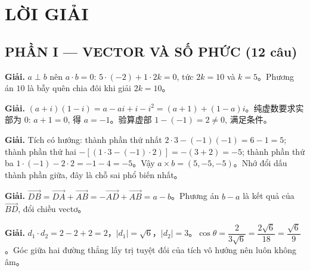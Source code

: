 \documentclass[11pt, a4paper]{article}
\begin{document}
\section{LỜI GIẢI}

\subsection{PHẦN I — VECTOR VÀ SỐ PHỨC (12 câu)}

\begin{dapan}[1 — Đáp án A]

\textbf{Giải.} $a\perp b$ nên $a\cdot b=0$: $5\cdot(-2)+1\cdot2k=0$, tức $2k=10$ và $k=5$。Phương án $10$ là bẫy quên chia đôi khi giải $2k=10$。


\end{dapan}
\vspace{0.3cm}
\begin{dapan}[2 — Đáp án C]

\textbf{Giải.} $(a+i)(1-i)=a-ai+i-i^2=(a+1)+(1-a)i$。纯虚数要求实部为 $0$: $a+1=0$, 得 $a=-1$。验算虚部 $1-(-1)=2\neq0$, 满足条件。


\end{dapan}
\vspace{0.3cm}
\begin{dapan}[3 — Đáp án A]

\textbf{Giải.} Tích có hướng: thành phần thứ nhất $2\cdot3-(-1)(-1)=6-1=5$; thành phần thứ hai $-[(1\cdot3-(-1)\cdot2)]=-(3+2)=-5$; thành phần thứ ba $1\cdot(-1)-2\cdot2=-1-4=-5$。Vậy $a\times b=(5,-5,-5)$。Nhớ đổi dấu thành phần giữa, đây là chỗ sai phổ biến nhất。


\end{dapan}
\vspace{0.3cm}
\begin{dapan}[4 — Đáp án D]

\textbf{Giải.} $\overrightarrow{DB}=\overrightarrow{DA}+\overrightarrow{AB}=-\overrightarrow{AD}+\overrightarrow{AB}=a-b$。Phương án $b-a$ là kết quả của $\overrightarrow{BD}$, đổi chiều vectơ。


\end{dapan}
\vspace{0.3cm}
\begin{dapan}[5 — Đáp án C]

\textbf{Giải.} $d_1\cdot d_2=2-2+2=2$，$\lvert d_1\rvert=\sqrt{6}$，$\lvert d_2\rvert=3$。$\cos\theta=\dfrac{2}{3\sqrt{6}}=\dfrac{2\sqrt{6}}{18}=\dfrac{\sqrt{6}}{9}$。Góc giữa hai đường thẳng lấy trị tuyệt đối của tích vô hướng nên luôn không âm。


\end{dapan}
\end{document}
